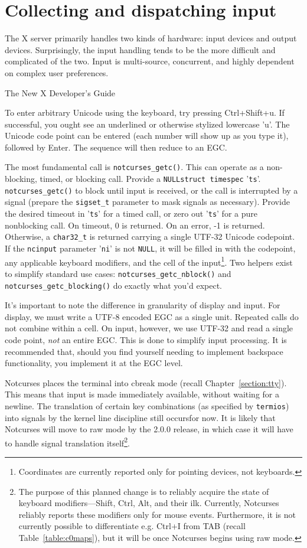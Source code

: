 \section{Collecting and dispatching input}
\label{sec:input}
\epigraph{The X server primarily handles two kinds of hardware: input devices and output devices. Surprisingly, the input handling tends to be the more difficult and complicated of the two. Input is multi-source, concurrent, and highly dependent on complex user preferences.}{The New X Developer's Guide\cite{x}}
To enter arbitrary Unicode using the keyboard, try pressing Ctrl+Shift+u. If
successful, you ought see an underlined or otherwise stylized lowercase 'u'.
The Unicode code point can be entered (each number will show up as you type it),
followed by Enter. The sequence will then reduce to an EGC.

The most fundamental call is \texttt{notcurses\_getc()}. This can operate as a
non-blocking, timed, or blocking call. Provide a \texttt{NULL}\texttt{struct timespec} '\texttt{ts}'.
\texttt{notcurses\_getc()} to block until input is received, or the call is
interrupted by a signal (prepare the \texttt{sigset\_t} parameter to mask signals
as necessary). Provide the desired timeout in '\texttt{ts}' for a timed call,
or zero out '\texttt{ts}' for a pure nonblocking call. On timeout, 0 is returned.
On an error, -1 is returned. Otherwise, a \texttt{char32\_t} is returned carrying
a single UTF-32 Unicode codepoint. If the \texttt{ncinput} parameter '\texttt{ni}'
is not \texttt{NULL}, it will be filled in with the codepoint, any applicable
keyboard modifiers, and the cell of the input\footnote{Coordinates are currently
reported only for pointing devices, not keyboards.}. Two helpers exist to simplify
standard use cases: \texttt{notcurses\_getc\_nblock()} and \texttt{notcurses\_getc\_blocking()}
do exactly what you'd expect.

It's important to note the difference in granularity of display and input. For
display, we must write a UTF-8 encoded EGC as a single unit. Repeated calls do
not combine within a cell. On input, however, we use UTF-32 and read a single
code point, \textit{not} an entire EGC. This is done to simplify input
processing. It is recommended that, should you find yourself needing to
implement backspace functionality, you implement it at the EGC level.

Notcurses places the terminal into cbreak mode (recall Chapter~\ref{section:tty}).
This means that input is made immediately available, without waiting for a newline.
The translation of certain key combinations (as specified by \texttt{termios})
into signals by the kernel line discipline still occurs\textellipsis for now.
It is likely that Notcurses will move to raw mode by the 2.0.0 release, in
which case it will have to handle signal translation itself\footnote{The purpose
of this planned change is to reliably acquire the state of keyboard modifiers---Shift,
Ctrl, Alt, and their ilk. Currently, Notcurses reliably reports these modifiers
only for mouse events. Furthermore, it is not currently possible to differentiate
e.g. Ctrl+I from TAB (recall Table~\ref{table:c0maps}), but it will be once
Notcurses begins using raw mode.}.


